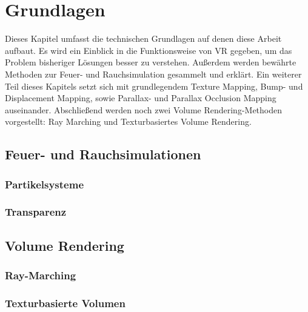 \section{Grundlagen}
\label{sec:3}
Dieses Kapitel umfasst die technischen Grundlagen auf denen diese Arbeit aufbaut. 
Es wird ein Einblick in die Funktionsweise von VR gegeben, um das Problem bisheriger Lösungen 
besser zu verstehen. Außerdem werden bewährte Methoden zur Feuer- und Rauchsimulation
gesammelt und erklärt. Ein weiterer Teil dieses Kapitels setzt sich mit grundlegendem Texture Mapping,
Bump- und Displacement Mapping, sowie Parallax- und Parallax Occlusion Mapping auseinander. Abschließend 
werden noch zwei Volume Rendering-Methoden vorgestellt: Ray Marching und Texturbasiertes Volume Rendering.







\subsection{Feuer- und Rauchsimulationen}
\subsubsection{Partikelsysteme}
\subsubsection{Transparenz}



\subsection{Volume Rendering}
\subsubsection{Ray-Marching}
\subsubsection{Texturbasierte Volumen}


\newpage

